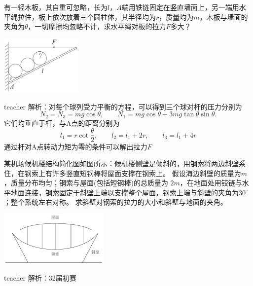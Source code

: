 \begin{example}

有一轻木板，其自重可忽略，长为$l$，$A$端用铁链固定在竖直墙面上，另一端用水平绳拉住，板上依次放着三个圆柱体，其半径均为$r$，质量均为$m$，木板与墙面的夹角为$\theta$，一切摩擦均忽略不计，求水平绳对板的拉力$F$多大？
\begin{flushright}
\includegraphics[width = 0.3\textwidth]{images/static-force-18.pdf} 
\end{flushright}
\begin{taggedblock}{teacher}
\noindent
解析：对每个球列受力平衡的方程，可以得到三个球对杆的压力分别为
\[
N_2=N_3 = mg\cos\theta,\qquad N_1 = mg\cos\theta+3mg\tan\theta\sin\theta.
\]
它们均垂直于杆，与A点的距离分别为
\[
l_1 = r\cot\frac{\theta}{2},\qquad l_2 = l_1+2r,\qquad l_3 = l_1+4r
\]
通过杆对A点转动力矩为零的条件可以解出拉力$F$
\end{taggedblock}
\end{example}


\begin{example}


某机场候机楼结构简化图如图所示：候机楼侧壁是倾斜的，用钢索将两边斜壁系住，在钢索上有许多竖直短钢棒将屋面支撑在钢索上。
假设海边斜壁的质量为$m$，质量分布均匀；钢索与屋面(包括短钢棒)的总质量为 $2m$，在地面处用铰链与水平地面连接，钢索固定于斜壁上端以支撑整个屋面，钢索上端与斜壁的夹角为$30^\circ$；整个系统左右对称。
求斜壁对钢索的拉力的大小和斜壁与地面的夹角。
\begin{flushright}
\includegraphics[width = 0.4\textwidth]{images/static-force-26.pdf} 
\end{flushright}
\begin{taggedblock}{teacher}
\noindent
解析：32届初赛
\end{taggedblock}
\end{example}



